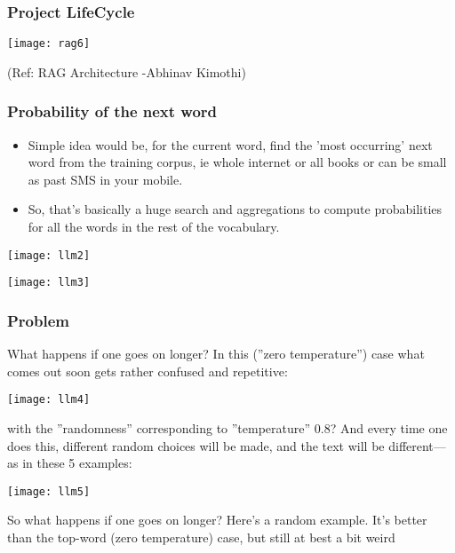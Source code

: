 \begin{frame}[fragile]\frametitle{Project LifeCycle}


		\begin{center}
		\texttt{[image: rag6]}
		\end{center}

{\tiny (Ref: RAG Architecture -Abhinav  Kimothi)}

\end{frame}


\begin{frame}[fragile]\frametitle{Probability of the next word}

\begin{itemize}
\item Simple idea would be, for the current word, find the 'most occurring' next word from the training corpus, ie whole internet or all books or can be small as past SMS in your mobile.
\item So, that's basically a huge search and aggregations to compute probabilities for all the words in the rest of the vocabulary.
\end{itemize}	

\begin{center}
\texttt{[image: llm2]}

\texttt{[image: llm3]}
\end{center}


\end{frame}

\begin{frame}[fragile]\frametitle{Problem}

What happens if one goes on longer? In this (''zero temperature'') case what comes out soon gets rather confused and repetitive:

\begin{center}
\texttt{[image: llm4]}
\end{center}

with the ''randomness'' corresponding to ''temperature'' 0.8? And every time one does this, different random choices will be made, and the text will be different—as in these 5 examples:

\begin{center}
\texttt{[image: llm5]}
\end{center}

So what happens if one goes on longer? Here’s a random example. It’s better than the top-word (zero temperature) case, but still at best a bit weird

\end{frame}


